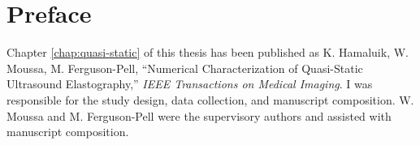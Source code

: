 \onehalfspacing
\chapter*{Preface}
	Chapter \ref{chap:quasi-static} of this thesis has been published as K. Hamaluik, W. Moussa, M. Ferguson-Pell, ``Numerical Characterization of Quasi-Static Ultrasound Elastography,'' \emph{IEEE Transactions on Medical Imaging}. I was responsible for the study design, data collection, and manuscript composition. W. Moussa and M. Ferguson-Pell were the supervisory authors and assisted with manuscript composition.